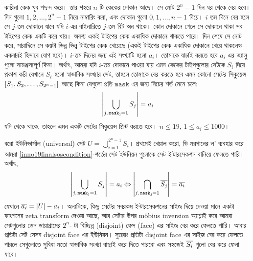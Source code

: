 \begin{example}
  কারিনা কেক খুব পছন্দ করে। তার শহরে $n$ টি কেকের দোকান আছে। সে মোট $2^n-1$
  দিন ঘর থেকে বের হবে। দিন গুলো $1, 2, \ldots, 2^{n}-1$ নিয়ে নাম্বারিং করা,
  এবং দোকান গুলো $0, 1, \ldots, n-1$ দিয়ে। $i$ তম দিনে বের হলে সে $j$-তম
  দোকানে যাবে যদি $i$-এর বাইনারিতে $j$-তম বিট অন থাকে। কোন দোকানে গেলে সে
  দোকানে থাকা সব টাইপের কেক একটি করে খায়। অবশ্য একই টাইপের কেক একাধিক দোকানে
  থাকতে পারে। দিন শেষে সে নোট করে, সারাদিনে সে কয়টা ভিন্ন ভিন্ন টাইপের কেক
  খেয়েছে (একই টাইপের কেক একাধিক দোকানে খেয়ে থাকলেও একবারই হিসাবে যোগ হবে)।
  $i$-তম দিনের জন্য এই সংখ্যাটি হলো $a_i$। তোমাকে যাচাই করতে হবে $a_i$ এর
  ভ্যালু গুলো সামঞ্জস্যপূর্ণ কিনা। অর্থাৎ, আমরা যদি $i$-তম দোকানে পাওয়া যায়
  এমন কেকের টাইপগুলোর সেটকে $S_i$ দিয়ে প্রকাশ করি যেখানে $S_i$ হলো স্বাভাবিক
  সংখ্যার সেট, তাহলে তোমাকে বের করতে হবে
  এমন কোনো সেটের সিকুয়েন্স $\left [ S_1, S_2, \ldots, S_{2^n-1} \right ]$ আছে কিনা
  যেগুলো প্রতি $\mathtt{mask}$ এর জন্য নিচের শর্ত মেনে চলে:
  \begin{equation}
    \label{inno19finalsoscondition}
    \left| \bigcup_{j,\, \mathtt{mask_j} = 1} S_j \right| = a_i
  \end{equation}
  যদি থেকে থাকে, তাহলে এমন একটি সেটের সিকুয়েন্স প্রিন্ট করতে হবে। $n \le 19$,
  $1 \le a_i \le 1000$।
\end{example}
\begin{solution}
  ধরো ইউনিভার্সাল (universal) সেট $U = \bigcup_{i=1}^{2^n-1} S_i$। প্রথমেই
  খেয়াল করো, ডি মরগানের ল' ব্যবহার করে আমরা
  \ref{inno19finalsoscondition}-শর্তের সেট ইউনিয়ন গুলোকে সেট ইন্টারসেকশন
  বানিয়ে ফেলতে পারি। অর্থাৎ,
  \[
    \left| \bigcup_{j,\, \mathtt{mask_j} = 1} S_j \right| = a_i \Leftrightarrow
    \left| \bigcap_{j,\, \mathtt{mask_j} = 1} \overline{S_j} \right| = \overline{a_i}
  \]
  যেখানে $\overline{a_i} = |U| - a_i$। অন্যদিকে, কিছু সেটের সবরকম ইন্টারসেকশনের
  সাইজ দিয়ে দেওয়া মানে একটা ফাংশনের zeta transform দেওয়া আছে, আর সেটার উপর
  m{\"o}bius inversion অ্যাপ্লাই করে আমরা সেটগুলোর ভেন ডায়াগ্রামের $2^n$-
  টা বিচ্ছিন্ন (disjoint) ফেস (face) এর সাইজ বের করে ফেলতে পারি। আবার প্রতিটা সেট সেসব disjoint face এর ইউনিয়ন। সুতরাং প্রতিটা
  disjoint face এর সাইজ বের করে ফেলতে পারলে সেগুলোতে সুবিধা মতো স্বাভাবিক
  সংখ্যা বাছাই করে দিতে পারবো এবং সহজেই $\overline{S_i}$ গুলো বের করে ফেলা যাবে।
\end{solution}
